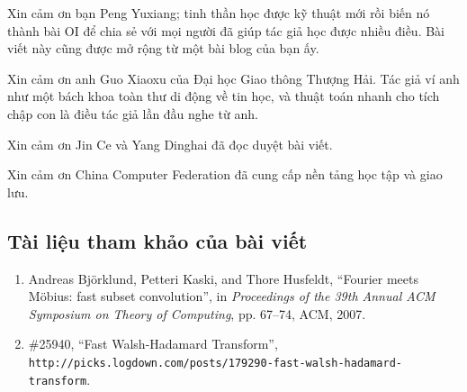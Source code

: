 \documentclass[11pt]{article}
\begin{document}
Xin cảm ơn bạn Peng Yuxiang; tinh thần học được kỹ thuật mới rồi biến nó thành
bài OI để chia sẻ với mọi người đã giúp tác giả học được nhiều điều. Bài viết
này cũng được mở rộng từ một bài blog của bạn ấy.

Xin cảm ơn anh Guo Xiaoxu của Đại học Giao thông Thượng Hải. Tác giả ví anh như
một bách khoa toàn thư di động về tin học, và thuật toán nhanh cho tích chập con
là điều tác giả lần đầu nghe từ anh.

Xin cảm ơn Jin Ce và Yang Dinghai đã đọc duyệt bài viết.

Xin cảm ơn China Computer Federation đã cung cấp nền tảng học tập và giao lưu.

\subsection*{Tài liệu tham khảo của bài viết}

\begin{enumerate}
  \item Andreas Björklund, Petteri Kaski, and Thore Husfeldt,
  ``Fourier meets Möbius: fast subset convolution'', in
  \emph{Proceedings of the 39th Annual ACM Symposium on Theory of Computing},
  pp. 67--74, ACM, 2007.
  \item \#25940, ``Fast Walsh-Hadamard Transform'',
  \texttt{http://picks.logdown.com/posts/179290-fast-walsh-hadamard-transform}.
\end{enumerate}
\end{document}
